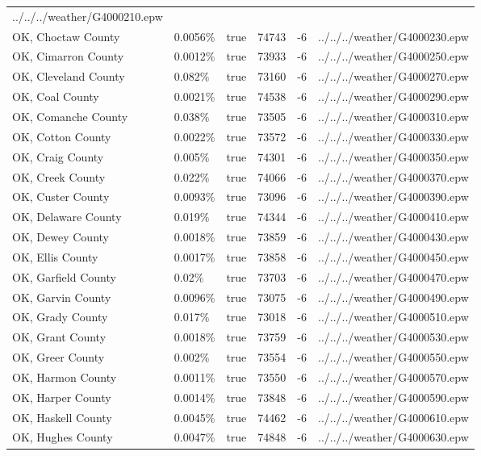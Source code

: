 \begin{longtable}[]{@{}llllll@{}}
../../../weather/G4000210.epw \\
OK, Choctaw County & 0.0056\% & true & 74743 & -6 &
../../../weather/G4000230.epw \\
OK, Cimarron County & 0.0012\% & true & 73933 & -6 &
../../../weather/G4000250.epw \\
OK, Cleveland County & 0.082\% & true & 73160 & -6 &
../../../weather/G4000270.epw \\
OK, Coal County & 0.0021\% & true & 74538 & -6 &
../../../weather/G4000290.epw \\
OK, Comanche County & 0.038\% & true & 73505 & -6 &
../../../weather/G4000310.epw \\
OK, Cotton County & 0.0022\% & true & 73572 & -6 &
../../../weather/G4000330.epw \\
OK, Craig County & 0.005\% & true & 74301 & -6 &
../../../weather/G4000350.epw \\
OK, Creek County & 0.022\% & true & 74066 & -6 &
../../../weather/G4000370.epw \\
OK, Custer County & 0.0093\% & true & 73096 & -6 &
../../../weather/G4000390.epw \\
OK, Delaware County & 0.019\% & true & 74344 & -6 &
../../../weather/G4000410.epw \\
OK, Dewey County & 0.0018\% & true & 73859 & -6 &
../../../weather/G4000430.epw \\
OK, Ellis County & 0.0017\% & true & 73858 & -6 &
../../../weather/G4000450.epw \\
OK, Garfield County & 0.02\% & true & 73703 & -6 &
../../../weather/G4000470.epw \\
OK, Garvin County & 0.0096\% & true & 73075 & -6 &
../../../weather/G4000490.epw \\
OK, Grady County & 0.017\% & true & 73018 & -6 &
../../../weather/G4000510.epw \\
OK, Grant County & 0.0018\% & true & 73759 & -6 &
../../../weather/G4000530.epw \\
OK, Greer County & 0.002\% & true & 73554 & -6 &
../../../weather/G4000550.epw \\
OK, Harmon County & 0.0011\% & true & 73550 & -6 &
../../../weather/G4000570.epw \\
OK, Harper County & 0.0014\% & true & 73848 & -6 &
../../../weather/G4000590.epw \\
OK, Haskell County & 0.0045\% & true & 74462 & -6 &
../../../weather/G4000610.epw \\
OK, Hughes County & 0.0047\% & true & 74848 & -6 &
../../../weather/G4000630.epw \\

\end{longtable}
